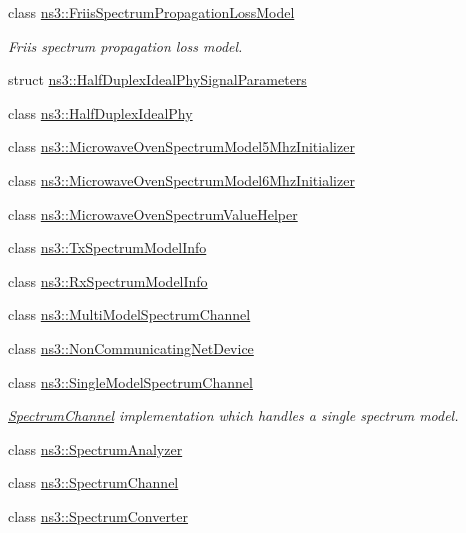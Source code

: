 \begin{DoxyCompactItemize}
\item 
class \hyperlink{classns3_1_1FriisSpectrumPropagationLossModel}{ns3\+::\+Friis\+Spectrum\+Propagation\+Loss\+Model}
\begin{DoxyCompactList}\small\item\em Friis spectrum propagation loss model. \end{DoxyCompactList}\item 
struct \hyperlink{structns3_1_1HalfDuplexIdealPhySignalParameters}{ns3\+::\+Half\+Duplex\+Ideal\+Phy\+Signal\+Parameters}
\item 
class \hyperlink{classns3_1_1HalfDuplexIdealPhy}{ns3\+::\+Half\+Duplex\+Ideal\+Phy}
\item 
class \hyperlink{classns3_1_1MicrowaveOvenSpectrumModel5MhzInitializer}{ns3\+::\+Microwave\+Oven\+Spectrum\+Model5\+Mhz\+Initializer}
\item 
class \hyperlink{classns3_1_1MicrowaveOvenSpectrumModel6MhzInitializer}{ns3\+::\+Microwave\+Oven\+Spectrum\+Model6\+Mhz\+Initializer}
\item 
class \hyperlink{classns3_1_1MicrowaveOvenSpectrumValueHelper}{ns3\+::\+Microwave\+Oven\+Spectrum\+Value\+Helper}
\item 
class \hyperlink{classns3_1_1TxSpectrumModelInfo}{ns3\+::\+Tx\+Spectrum\+Model\+Info}
\item 
class \hyperlink{classns3_1_1RxSpectrumModelInfo}{ns3\+::\+Rx\+Spectrum\+Model\+Info}
\item 
class \hyperlink{classns3_1_1MultiModelSpectrumChannel}{ns3\+::\+Multi\+Model\+Spectrum\+Channel}
\item 
class \hyperlink{classns3_1_1NonCommunicatingNetDevice}{ns3\+::\+Non\+Communicating\+Net\+Device}
\item 
class \hyperlink{classns3_1_1SingleModelSpectrumChannel}{ns3\+::\+Single\+Model\+Spectrum\+Channel}
\begin{DoxyCompactList}\small\item\em \hyperlink{classns3_1_1SpectrumChannel}{Spectrum\+Channel} implementation which handles a single spectrum model. \end{DoxyCompactList}\item 
class \hyperlink{classns3_1_1SpectrumAnalyzer}{ns3\+::\+Spectrum\+Analyzer}
\item 
class \hyperlink{classns3_1_1SpectrumChannel}{ns3\+::\+Spectrum\+Channel}
\item 
class \hyperlink{classns3_1_1SpectrumConverter}{ns3\+::\+Spectrum\+Converter}
\item 

\end{DoxyCompactItemize}

